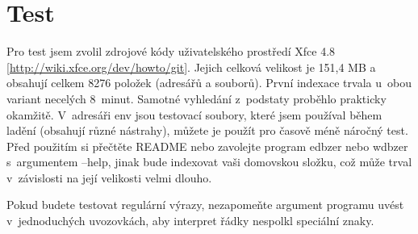 \documentclass[a4paper]{article}
\begin{document}
\section{Test}

Pro test jsem zvolil zdrojové kódy uživatelského prostředí Xfce 4.8 [\url{http://wiki.xfce.org/dev/howto/git}]. Jejich celková velikost je 151,4 MB a obsahují celkem 8276 položek (adresářů a souborů). První indexace trvala u~obou variant necelých 8~minut. Samotné vyhledání z~podstaty proběhlo prakticky okamžitě. V~adresáři env jsou testovací soubory, které jsem používal během ladění (obsahují různé nástrahy), můžete je použít pro časově méně náročný test. Před použitím si přečtěte README nebo zavolejte program edbzer nebo wdbzer s~argumentem --help, jinak bude indexovat vaši domovskou složku, což může trval v~závislosti na její velikosti velmi dlouho.

Pokud budete testovat regulární výrazy, nezapomeňte argument programu uvést v~jednoduchých uvozovkách, aby interpret řádky nespolkl speciální znaky.
\end{document}
